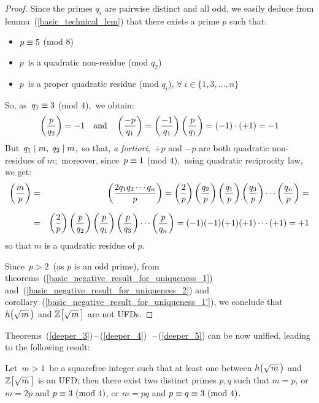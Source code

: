 \begin{proof}
%
Since the primes $q_i$ are pairwise distinct and all odd, we
easily deduce from lemma~(\ref{basic_technical_lem}) that there
exists a prime $p$ such that:

\begin{itemize}

\item $p \equiv 5$ (mod 8)

\item $p$\, is a quadratic non-residue (mod $q_2$)

\item $p$\, is a proper quadratic residue (mod $q_i$),
$\forall\: i \in \{1, 3, \ldots, n\}$

\end{itemize}

So, as\, $q_1 \equiv 3$ (mod $4$),\, we obtain:
$$
\left(\frac{p}{q_2}\right) = -1 \quad \textrm{and} \quad
\left(\frac{-p}{q_1}\right) = \left(\frac{-1}{q_1}\right) \left(\frac{p}{q_1}\right)
= (-1) \cdot (+1) = -1
$$
But \,$q_1 \mid m,\; q_2 \mid m$,\,
so that, \emph{a fortiori},\, $+p$ and $-p$
are both quadratic non-residues of $m$;\,
moreover, since\, $p \equiv 1$ (mod $4$),\,
using quadratic reciprocity law, we get:
\medskip
\setlength\arraycolsep{2pt}
\begin{eqnarray*}
\left(\frac{m}{p}\right) & = &\left(\frac{2 q_1 q_2 \cdots q_n}{p}\right) =
\left(\frac{2}{p}\right)\left(\frac{q_2}{p}\right) \left(\frac{q_1}{p}\right) \left(\frac{q_3}{p}\right)
\cdots \left(\frac{q_n}{p}\right) = \\[7pt]
& = & \left(\frac{2}{p}\right)\left(\frac{p}{q_2}\right) \left(\frac{p}{q_1}\right) \left(\frac{p}{q_3}\right)
\cdots \left(\frac{p}{q_n}\right) = (-1)(-1)(+1)(+1)\cdots(+1) = +1
\end{eqnarray*}
{\flushleft
so that $m$ is a quadratic residue of $p$.}

Since\, $p > 2$\, (as $p$ is an odd prime), from
theorems~(\ref{basic_negative_result_for_uniqueness_1})
and~(\ref{basic_negative_result_for_uniqueness_2})
and corollary~(\ref{basic_negative_result_for_uniqueness_1'}),
we conclude that $\hh{m}$ and $\ZZ{m}$ are not UFDs.
%
\end{proof}

%
\bigskip
\mbox{Theorems (\ref{deeper_3})\,--\,(\ref{deeper_4})\,%
--\,(\ref{deeper_5})} can be now unified, leading to the
following result:

\begin{thm}\label{DEEPER}
Let\, $m > 1$\, be a squarefree integer such that at least one between
$\hh{m}$ and $\ZZ{m}$ is an UFD; then there exist two distinct primes
$p,q$ such that $m = p$, or $m = 2p$ and
$p \congruent 3\ \mathrm{(mod\ 4)}$, or $m = pq$ and
$p \congruent q \congruent 3\ \mathrm{(mod\ 4)}$.
\end{thm}

